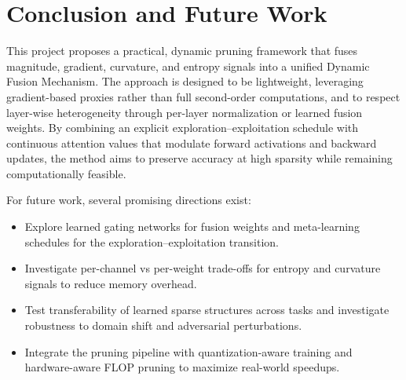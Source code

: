 \documentclass[12pt,a4paper]{report}
\begin{document}
\clearpage

\chapter{Conclusion and Future Work}
This project proposes a practical, dynamic pruning framework that fuses magnitude, gradient, curvature, and entropy signals into a unified Dynamic Fusion Mechanism. The approach is designed to be lightweight, leveraging gradient-based proxies rather than full second-order computations, and to respect layer-wise heterogeneity through per-layer normalization or learned fusion weights. By combining an explicit exploration–exploitation schedule with continuous attention values that modulate forward activations and backward updates, the method aims to preserve accuracy at high sparsity while remaining computationally feasible.

For future work, several promising directions exist:
\begin{itemize}
    \item Explore learned gating networks for fusion weights and meta-learning schedules for the exploration–exploitation transition.
    \item Investigate per-channel vs per-weight trade-offs for entropy and curvature signals to reduce memory overhead.
    \item Test transferability of learned sparse structures across tasks and investigate robustness to domain shift and adversarial perturbations.
    \item Integrate the pruning pipeline with quantization-aware training and hardware-aware FLOP pruning to maximize real-world speedups.
\end{itemize}

\clearpage
\end{document}
